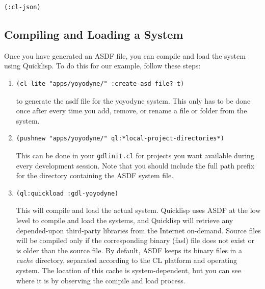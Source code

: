 \documentclass [11pt]{book}
\begin{document}
\begin{verbatim}(:cl-json)
\end{verbatim}



\subsection{Compiling and Loading a System}

\label{subsec:compilingandloadingasystem}

Once you have generated an ASDF file, you can compile and
load the system using Quicklisp. To do this for our example, follow these steps:

\begin{enumerate}

\item 

\begin{verbatim}(cl-lite "apps/yoyodyne/" :create-asd-file? t)
\end{verbatim} to generate the asdf file for the yoyodyne system. This only has to be done once after every time you add, remove, or rename a file or folder from the system.

\item 

\begin{verbatim}(pushnew "apps/yoyodyne/" ql:*local-project-directories*)
\end{verbatim} This can be done in your \texttt{gdlinit.cl} for projects you want available during every development session. Note that you should include
the full path prefix for the directory containing the ASDF system file.

\item 

\begin{verbatim}(ql:quickload :gdl-yoyodyne)
\end{verbatim} This will compile and load the actual system. Quicklisp
uses ASDF at the low level to compile and load the systems, and
Quicklisp will retrieve any depended-upon third-party libraries from
the Internet on-demand.  Source files will be compiled only if the
corresponding binary (fasl) file does not exist or is older than the
source file. By default, ASDF keeps its binary files in a  \emph{cache} directory, separated according to the CL platform and
operating system. The location of this cache is system-dependent, but
you can see where it is by observing the compile and load
process.

\end{enumerate}
\end{document}

